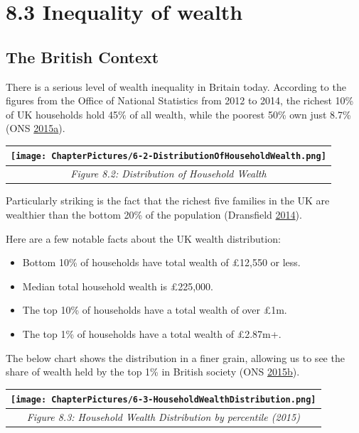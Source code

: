 \documentclass[]{tufte-handout}
\begin{document}
\hypertarget{inequality-of-wealth}{%
\section{8.3 Inequality of wealth}\label{inequality-of-wealth}}

\hypertarget{the-british-context}{%
\subsection{The British Context}\label{the-british-context}}

There is a serious level of wealth inequality in Britain today.
According to the figures from the Office of National Statistics from
2012 to 2014, the richest 10\% of UK households hold 45\% of all wealth,
while the poorest 50\% own just 8.7\% (ONS
\protect\hyperlink{ref-ONS2015}{2015}\protect\hyperlink{ref-ONS2015}{a}).

\begin{longtable}[]{@{}c@{}}
\toprule
\texttt{[image: ChapterPictures/6-2-DistributionOfHouseholdWealth.png]}\tabularnewline
\midrule
\endhead
\emph{Figure 8.2: Distribution of Household Wealth}\tabularnewline
\bottomrule
\end{longtable}

Particularly striking is the fact that the richest five families in the
UK are wealthier than the bottom 20\% of the population (Dransfield
\protect\hyperlink{ref-Dransfield2014}{2014}).

Here are a few notable facts about the UK wealth distribution:

\begin{itemize}
\item
  Bottom 10\% of households have total wealth of £12,550 or less.
\item
  Median total household wealth is £225,000.
\item
  The top 10\% of households have a total wealth of over £1m.
\item
  The top 1\% of households have a total wealth of £2.87m+.
\end{itemize}

The below chart shows the distribution in a finer grain, allowing us to
see the share of wealth held by the top 1\% in British society (ONS
\protect\hyperlink{ref-ONSWELLBEING2015}{2015}\protect\hyperlink{ref-ONSWELLBEING2015}{b}).

\begin{longtable}[]{@{}c@{}}
\toprule
\texttt{[image: ChapterPictures/6-3-HouseholdWealthDistribution.png]}\tabularnewline
\midrule
\endhead
\emph{Figure 8.3: Household Wealth Distribution by percentile
(2015)}\tabularnewline
\bottomrule
\end{longtable}
\end{document}
